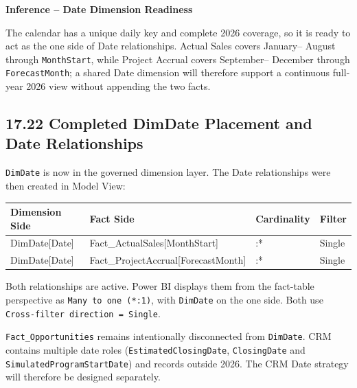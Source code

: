 \documentclass[11pt,a4paper]{article}
\begin{document}
\begin{inferencebox}

\textbf{Inference -- Date Dimension Readiness}

The calendar has a unique daily key and complete 2026 coverage, so it is ready
to act as the one side of Date relationships. Actual Sales covers January--
August through \texttt{MonthStart}, while Project Accrual covers September--
December through \texttt{ForecastMonth}; a shared Date dimension will therefore
support a continuous full-year 2026 view without appending the two facts.

\end{inferencebox}

\subsection{17.22 Completed DimDate Placement and Date Relationships}

\texttt{DimDate} is now in the governed dimension layer. The Date relationships
were then created in Model View:

\begin{tabularx}{\textwidth}{
    >{\ttfamily\raggedright\arraybackslash}p{5.1cm}
    >{\ttfamily\raggedright\arraybackslash}p{5.1cm}
    >{\centering\arraybackslash}p{1.7cm}
    >{\centering\arraybackslash}X
}

\toprule

Dimension Side
&
Fact Side
&
Cardinality
&
Filter
\\

\midrule

DimDate[Date]
&
Fact\_ActualSales[MonthStart]
&
1:*
&
Single
\\

DimDate[Date]
&
Fact\_ProjectAccrual[ForecastMonth]
&
1:*
&
Single
\\

\bottomrule

\end{tabularx}

Both relationships are active. Power BI displays them from the fact-table
perspective as \texttt{Many to one (*:1)}, with \texttt{DimDate} on the one
side. Both use \texttt{Cross-filter direction = Single}.

\texttt{Fact\_Opportunities} remains intentionally disconnected from
\texttt{DimDate}. CRM contains multiple date roles
(\texttt{EstimatedClosingDate}, \texttt{ClosingDate} and
\texttt{SimulatedProgramStartDate}) and records outside 2026. The CRM Date
strategy will therefore be designed separately.
\end{document}
